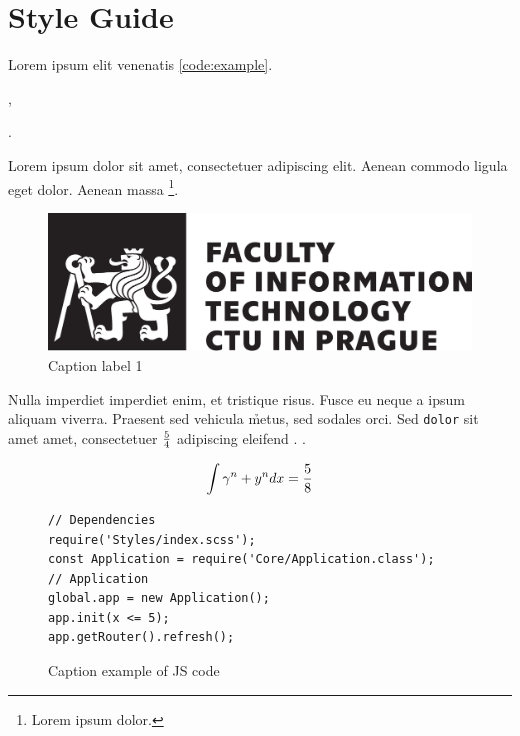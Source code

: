 \chapter{Style Guide}\label{styleguide}

Lorem ipsum elit venenatis \ref{code:example}.

\begin{ul}
   \item
\end{ul}

\begin{dl}
   \item[] ,
   \item[] .
\end{dl}

\begin{ol}
   \item
\end{ol}


\begin{REFACTOR}
   Lorem ipsum dolor sit amet, consectetuer adipiscing elit. Aenean commodo ligula eget dolor. Aenean massa \footnote{Lorem ipsum dolor.}.
\end{REFACTOR}


\begin{figure}[htbp]
   \centering
   \includegraphics[max width=\textwidth]{cvut-logo-bw-en.pdf}
   \caption[List label 1]{Caption label 1}\label{pic:ctulogo}
\end{figure}



Nulla imperdiet imperdiet enim, et tristique risus. Fusce eu neque a ipsum aliquam viverra. Praesent sed vehicula \h{metus}, sed sodales orci. Sed \verb|dolor| sit amet amet, consectetuer ${5} \over {4}$ adipiscing eleifend . .

$$\int {\gamma^n + y^n } dx = { 5 \over 8}$$


\begin{figure}[htbp]
   \centering
   \begin{verbatim}
// Dependencies
require('Styles/index.scss');
const Application = require('Core/Application.class');
// Application
global.app = new Application();
app.init(x <= 5);
app.getRouter().refresh();
   \end{verbatim}
   \caption[List example of JS code]{Caption example of JS code}\label{code:jsexample}
\end{figure}


